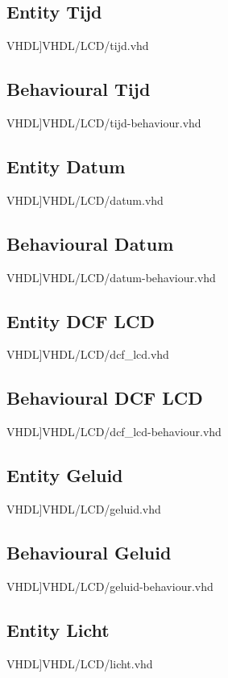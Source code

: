 \subsection{Entity Tijd}
\label{code:ent_tijd}
\scriptsize 
 VHDL]{VHDL/LCD/tijd.vhd}
\normalsize
\label{code:beh_tijd}
\subsection{Behavioural Tijd}
\scriptsize 
 VHDL]{VHDL/LCD/tijd-behaviour.vhd}
\normalsize
\label{code:ent_datum}
\subsection{Entity Datum}
\scriptsize 
 VHDL]{VHDL/LCD/datum.vhd}
\normalsize
\label{code:beh_datum}
\subsection{Behavioural Datum}
\scriptsize 
 VHDL]{VHDL/LCD/datum-behaviour.vhd}
\normalsize
\label{code:ent_dcf-lcd}
\subsection{Entity DCF LCD}
\scriptsize 
 VHDL]{VHDL/LCD/dcf_lcd.vhd}
\normalsize
\label{code:beh_dcf-lcd}
\subsection{Behavioural DCF LCD}
\scriptsize 
 VHDL]{VHDL/LCD/dcf_lcd-behaviour.vhd}
\normalsize
\label{code:ent_geluid}
\subsection{Entity Geluid}
\scriptsize 
 VHDL]{VHDL/LCD/geluid.vhd}
\normalsize
\label{code:beh_geluid}
\subsection{Behavioural Geluid}
\scriptsize 
 VHDL]{VHDL/LCD/geluid-behaviour.vhd}
\normalsize
\label{code:ent_licht}
\subsection{Entity Licht}
\scriptsize 
 VHDL]{VHDL/LCD/licht.vhd}
\normalsize
\label{code:beh_licht}
